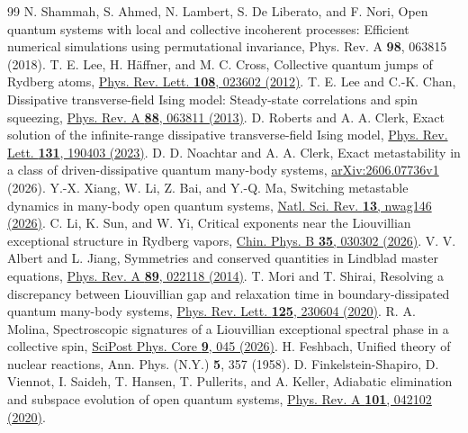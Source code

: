 \documentclass[aps,pra,10pt,onecolumn,superscriptaddress,amsmath,amssymb]{revtex4-2}
\begin{document}
\begin{thebibliography}{99}
 N. Shammah, S. Ahmed, N. Lambert, S. De Liberato, and F. Nori, Open quantum systems with local and collective incoherent processes: Efficient numerical simulations using permutational invariance, Phys. Rev. A \textbf{98}, 063815 (2018).
 T. E. Lee, H. H\"affner, and M. C. Cross, Collective quantum jumps of Rydberg atoms, \href{https://doi.org/10.1103/PhysRevLett.108.023602}{Phys. Rev. Lett. \textbf{108}, 023602 (2012)}.
 T. E. Lee and C.-K. Chan, Dissipative transverse-field Ising model: Steady-state correlations and spin squeezing, \href{https://doi.org/10.1103/PhysRevA.88.063811}{Phys. Rev. A \textbf{88}, 063811 (2013)}.
 D. Roberts and A. A. Clerk, Exact solution of the infinite-range dissipative transverse-field Ising model, \href{https://doi.org/10.1103/PhysRevLett.131.190403}{Phys. Rev. Lett. \textbf{131}, 190403 (2023)}.
 D. D. Noachtar and A. A. Clerk, Exact metastability in a class of driven-dissipative quantum many-body systems, \href{https://arxiv.org/abs/2606.07736v1}{arXiv:2606.07736v1} (2026).
 Y.-X. Xiang, W. Li, Z. Bai, and Y.-Q. Ma, Switching metastable dynamics in many-body open quantum systems, \href{https://doi.org/10.1093/nsr/nwag146}{Natl. Sci. Rev. \textbf{13}, nwag146 (2026)}.
 C. Li, K. Sun, and W. Yi, Critical exponents near the Liouvillian exceptional structure in Rydberg vapors, \href{https://doi.org/10.1088/1674-1056/adfb57}{Chin. Phys. B \textbf{35}, 030302 (2026)}.
 V. V. Albert and L. Jiang, Symmetries and conserved quantities in Lindblad master equations, \href{https://doi.org/10.1103/PhysRevA.89.022118}{Phys. Rev. A \textbf{89}, 022118 (2014)}.
 T. Mori and T. Shirai, Resolving a discrepancy between Liouvillian gap and relaxation time in boundary-dissipated quantum many-body systems, \href{https://doi.org/10.1103/PhysRevLett.125.230604}{Phys. Rev. Lett. \textbf{125}, 230604 (2020)}.
 R. A. Molina, Spectroscopic signatures of a Liouvillian exceptional spectral phase in a collective spin, \href{https://doi.org/10.21468/SciPostPhysCore.9.3.045}{SciPost Phys. Core \textbf{9}, 045 (2026)}.
 H. Feshbach, Unified theory of nuclear reactions, Ann. Phys. (N.Y.) \textbf{5}, 357 (1958).
 D. Finkelstein-Shapiro, D. Viennot, I. Saideh, T. Hansen, T. Pullerits, and A. Keller, Adiabatic elimination and subspace evolution of open quantum systems, \href{https://doi.org/10.1103/PhysRevA.101.042102}{Phys. Rev. A \textbf{101}, 042102 (2020)}.

\end{thebibliography}
\end{document}
